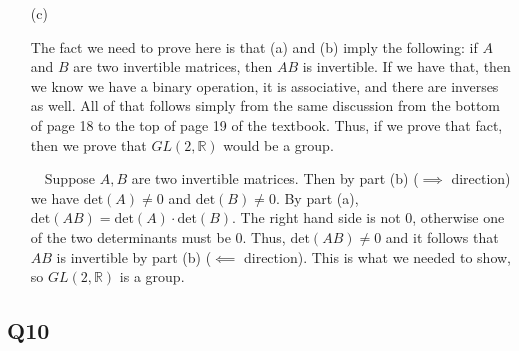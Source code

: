 \documentclass[12pt]{article}
\def\R{{\mathbb R}}        %
\numberwithin{theorem}{section}
\numberwithin{equation}{section}
\numberwithin{remark}{section}
\numberwithin{definition}{section}
\numberwithin{theorem}{section}
\numberwithin{lemma}{section}
\numberwithin{example}{section}
\begin{document}
\begin{itemize}
	\item[(c)]{The fact we need to prove here is that (a) and (b) imply the following: if $A$ and $B$ are two invertible matrices, then $AB$ is invertible. If we have that, then we know we have a binary operation, it is associative, and there are inverses as well. All of that follows simply from the same discussion from the bottom of page 18 to the top of page 19 of the textbook. Thus, if we prove that fact, then we prove that $GL(2,\R)$ would be a group. 
		
	\,\,\,\, Suppose $A,B$ are two invertible matrices. Then by part (b) ($\implies$ direction) we have $\text{det}(A)\neq0$ and $\text{det}(B)\neq0$. By part (a), $\text{det}(AB)=\text{det}(A)\cdot\text{det}(B)$. The right hand side is not 0, otherwise one of the two determinants must be 0. Thus, $\text{det}(AB)\neq0$ and it follows that $AB$ is invertible by part (b) ($\impliedby$ direction). This is what we needed to show, so $GL(2,\R)$ is a group.}
\end{itemize}



\subsection{Q10}
\end{document}
